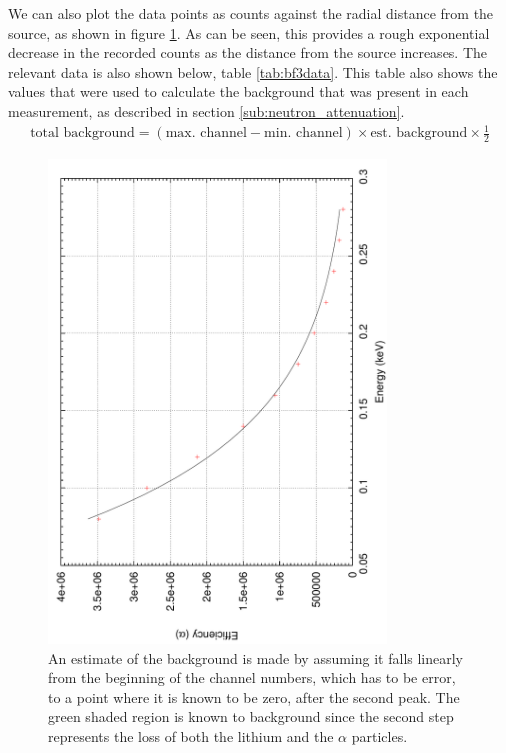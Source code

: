 We can also plot the data points as counts against the radial distance from the source, as shown in figure \ref{fig:bf3countsvsradius}. As can be seen, this provides a rough exponential decrease in the recorded counts as the distance from the source increases. The relevant data is also shown below, table \ref{tab:bf3data}. This table also shows the values that were used to calculate the background that was present in each measurement, as described in section \ref{sub:neutron_attenuation}.
\begin{align}
  \text{total background} = (\text{max. channel} - \text{min. channel}) \times \text{est. background} \times \frac{1}{2}
\end{align}
\begin{figure}[ht]
  \centering
  \includegraphics[angle=270,width=0.8\textwidth]{BF3countsvsradius.pdf}
  \caption{An estimate of the background is made by assuming it falls linearly from the beginning of the channel numbers, which has to be error, to a point where it is known to be zero, after the second peak. The green shaded region is known to background since the second step represents the loss of both the lithium and the $\alpha$ particles. \label{fig:bf3countsvsradius}}
\end{figure}
